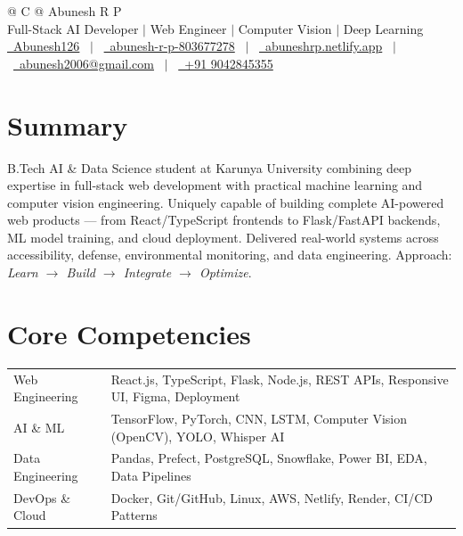 \documentclass[a4paper,12pt]{article}
\begin{document}
\pagestyle{empty}

\begin{tabularx}{\linewidth}{@{} C @{}}
\Huge{Abunesh R P} \\[5pt]
\normalsize{Full-Stack AI Developer $|$ Web Engineer $|$ Computer Vision $|$ Deep Learning} \\[3pt]
\href{https://github.com/Abunesh126}{\raisebox{-0.05\height}\faGithub\ Abunesh126} \ $|$ \
\href{https://linkedin.com/in/abunesh-r-p-803677278}{\raisebox{-0.05\height}\faLinkedin\ abunesh-r-p-803677278} \ $|$ \
\href{https://abuneshrp.netlify.app}{\raisebox{-0.05\height}\faGlobe\ abuneshrp.netlify.app} \ $|$ \
\href{mailto:abunesh2006@gmail.com}{\raisebox{-0.05\height}\faEnvelope\ abunesh2006@gmail.com} \ $|$ \
\href{tel:+919042845355}{\raisebox{-0.05\height}\faMobile\ +91 9042845355} \\
\end{tabularx}

\section{Summary}
B.Tech AI \& Data Science student at Karunya University combining deep expertise in full-stack web development with practical machine learning and computer vision engineering. Uniquely capable of building complete AI-powered web products — from React/TypeScript frontends to Flask/FastAPI backends, ML model training, and cloud deployment. Delivered real-world systems across accessibility, defense, environmental monitoring, and data engineering. Approach: \textit{Learn $\rightarrow$ Build $\rightarrow$ Integrate $\rightarrow$ Optimize}.

\section{Core Competencies}
\begin{tabularx}{\linewidth}{@{}l X@{}}
Web Engineering   & \normalsize{React.js, TypeScript, Flask, Node.js, REST APIs, Responsive UI, Figma, Deployment} \\
AI \& ML          & \normalsize{TensorFlow, PyTorch, CNN, LSTM, Computer Vision (OpenCV), YOLO, Whisper AI} \\
Data Engineering  & \normalsize{Pandas, Prefect, PostgreSQL, Snowflake, Power BI, EDA, Data Pipelines} \\
DevOps \& Cloud   & \normalsize{Docker, Git/GitHub, Linux, AWS, Netlify, Render, CI/CD Patterns} \\
\end{tabularx}
\end{document}
